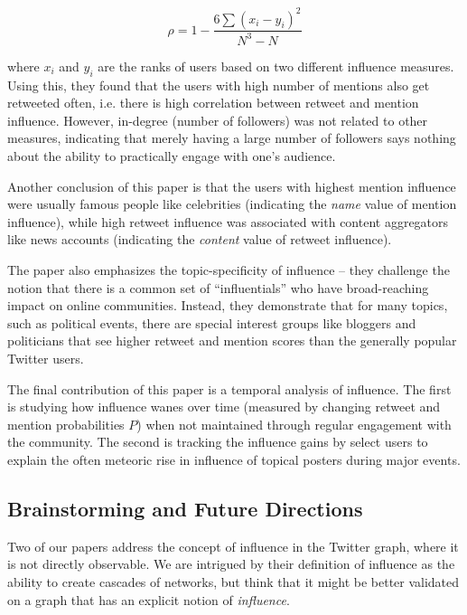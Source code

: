 \documentclass[10pt]{article}
\begin{document}
\begin{equation}
  \rho = 1 - \frac{6\sum{(x_i - y_i)^2}}{N^3 - N}
\end{equation}

where $x_i$ and $y_i$ are the ranks of users based on two different influence
measures. Using this, they found that the users with high number of mentions
also get retweeted often, i.e. there is high correlation between retweet and
mention influence. However, in-degree (number of followers) was not related to
other measures, indicating that merely having a large number of followers says
nothing about the ability to practically engage with one's audience.

Another conclusion of this paper is that the users with highest mention
influence were usually famous people like celebrities (indicating the
\emph{name} value of mention influence), while high retweet influence was
associated with content aggregators like news accounts (indicating the
\emph{content} value of retweet influence).

The paper also emphasizes the topic-specificity of influence -- they challenge
the notion that there is a common set of ``influentials'' who have
broad-reaching impact on online communities. Instead, they demonstrate that for
many topics, such as political events, there are special interest groups like
bloggers and politicians that see higher retweet and mention scores than the
generally popular Twitter users.

The final contribution of this paper is a temporal analysis of influence. The
first is studying how influence wanes over time (measured by changing retweet
and mention probabilities $P$) when not maintained through regular engagement
with the community. The second is tracking the influence gains by select users
to explain the often meteoric rise in influence of topical posters during major
events.

\subsection{Brainstorming and Future Directions}
Two of our papers address the concept of influence in the Twitter graph, where it is
not directly observable. We are intrigued by their definition of influence as the ability
to create cascades of networks, but think that it might be better validated on a graph
that has an explicit notion of \textit{influence}.

\end{document}
